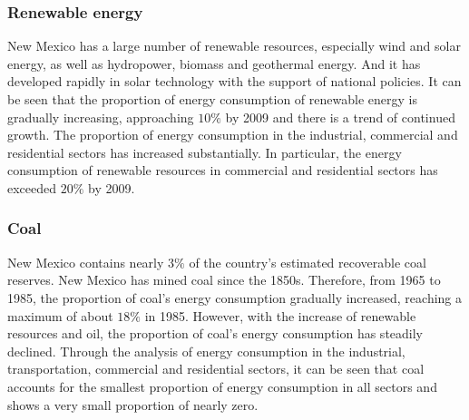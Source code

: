 \documentclass{mcmthesis}
\begin{document}
\subsubsection{Renewable energy}
  New Mexico has a large number of renewable resources, especially wind and solar energy, as well as hydropower, biomass and geothermal energy.
  And it has developed rapidly in solar technology with the support of national policies. It can be seen that the proportion of energy
  consumption of renewable energy is gradually increasing, approaching $10\%$ by 2009 and there is a trend of continued growth.
  The proportion of energy consumption in the industrial, commercial and residential sectors has increased substantially.
  In particular, the energy consumption of renewable resources in commercial and residential sectors has exceeded $20\%$ by 2009.
\subsubsection{Coal}
  New Mexico contains nearly $3\%$ of the country's estimated recoverable coal reserves. New Mexico has mined coal since the 1850s.
  Therefore, from 1965 to 1985, the proportion of coal's energy consumption gradually increased, reaching a maximum of about $18\%$ in 1985.
  However, with the increase of renewable resources and oil, the proportion of coal's energy consumption has steadily declined.
  Through the analysis of energy consumption in the industrial, transportation, commercial and residential sectors,
  it can be seen that coal accounts for the smallest proportion of energy consumption in all sectors and shows a very small proportion of nearly zero.
\end{document}

